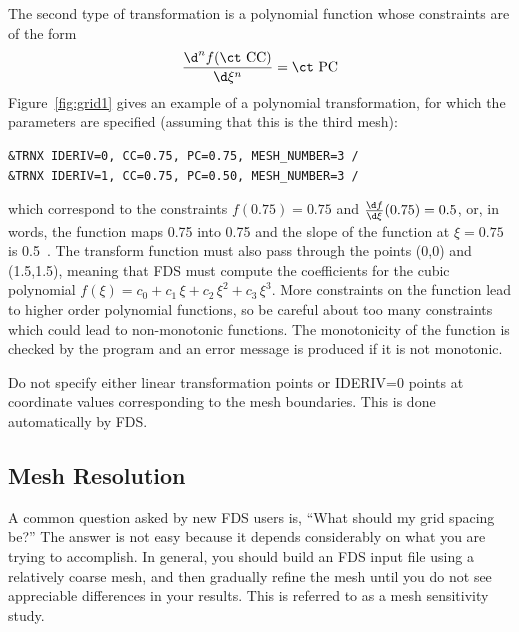 \documentclass[11pt]{book}
\begin{document}
The second type of transformation is a polynomial function whose constraints are of the form
\[ \frac{\d^n f(\hbox{\ct CC})}{\d\xi^n} = \hbox{\ct PC}   \]
Figure~\ref{fig:grid1} gives an example of a polynomial transformation, for which the parameters are specified (assuming that this is the third mesh):
\begin{lstlisting}
&TRNX IDERIV=0, CC=0.75, PC=0.75, MESH_NUMBER=3 /
&TRNX IDERIV=1, CC=0.75, PC=0.50, MESH_NUMBER=3 /
\end{lstlisting}
which correspond to the constraints
$f(0.75)=0.75$ and $\frac{\d f}{\d \xi}(0.75) = 0.5$, or, in words, the
function maps 0.75 into 0.75 and the slope of the function at
$\xi=0.75$ is 0.5~.
The transform function must also pass through the points (0,0) and (1.5,1.5), meaning that FDS must compute the coefficients for the cubic polynomial $f(\xi) = c_0 + c_1 \, \xi + c_2 \, \xi^2 + c_3 \, \xi^3$. More constraints on the function lead to higher order polynomial functions, so be careful about too many constraints which could lead to non-monotonic functions. The monotonicity of the function is checked by the program and an error message is produced if it is not monotonic.

Do not specify either linear transformation points or {\ct IDERIV=0} points at coordinate values corresponding to the mesh boundaries. This is done automatically by FDS.


\subsection{Mesh Resolution}
\label{info:Mesh_Resolution}

A common question asked by new FDS users is, ``What should my grid spacing be?''
The answer is not easy because it depends considerably on what you are trying
to accomplish. In general, you should build an FDS input file using a relatively
coarse mesh, and then gradually refine the mesh until you do not see
appreciable differences in your results. This is referred to as a mesh sensitivity study.
\end{document}
